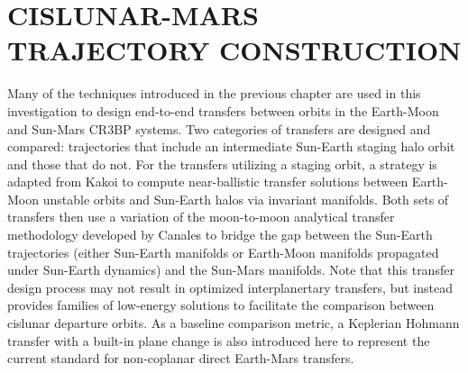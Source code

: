\chapter{CISLUNAR-MARS TRAJECTORY CONSTRUCTION}

Many of the techniques introduced in the previous chapter are used in this investigation to design
end-to-end transfers between orbits in the Earth-Moon and Sun-Mars CR3BP systems. Two categories of
transfers are designed and compared: trajectories that include an intermediate Sun-Earth staging
halo orbit and those that do not. For the transfers utilizing a staging orbit, a strategy is
adapted from Kakoi to compute near-ballistic transfer solutions between Earth-Moon unstable orbits
and Sun-Earth halos via invariant manifolds\cite{Kakoi:2015}. Both sets of transfers then use a
variation of the moon-to-moon analytical transfer methodology developed by Canales to bridge the
gap between the Sun-Earth trajectories (either Sun-Earth manifolds or Earth-Moon manifolds
propagated under Sun-Earth dynamics) and the Sun-Mars manifolds\cite{Canales:2021b}. Note that this
transfer design process may not result in optimized interplanertary transfers, but instead provides
families of low-energy solutions to facilitate the comparison between cislunar departure orbits. As
a baseline comparison metric, a Keplerian Hohmann transfer with a built-in plane change is also
introduced here to represent the current standard for non-coplanar direct Earth-Mars transfers.





